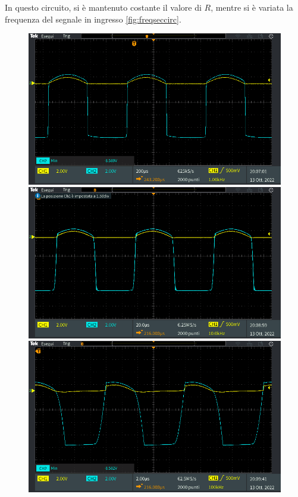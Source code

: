 \noindent
In questo circuito, si è mantenuto costante il valore di $R$, mentre si è variata la frequenza del segnale in ingresso \ref{fig:freqseccirc}.
\begin{figure}[h]
	\centering
	\begin{minipage}{.496\textwidth}
		\includegraphics[width=\linewidth]{./ImageFiles/Laboratorio 2/TEK00030.PNG}
	\end{minipage}
	\begin{minipage}{.496\textwidth}
		\includegraphics[width=\linewidth]{./ImageFiles/Laboratorio 2/TEK00032.PNG}
	\end{minipage}
	\begin{minipage}{.496\textwidth}
		\includegraphics[width=\linewidth]{./ImageFiles/Laboratorio 2/TEK00034.PNG}

\end{minipage}
\end{figure}
